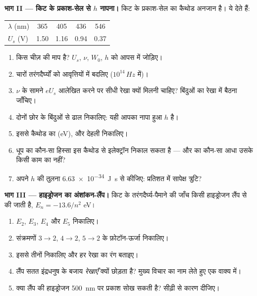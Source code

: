 \begin{problem}
\medskip
\noindent\textbf{भाग II --- किट के प्रकाश-सेल से $h$ नापना।}
किट के प्रकाश-सेल का कैथोड अनजान है।  ये देते हैं:
\begin{center}\small
\begin{tabular}{lcccc}
$\lambda$ (\unit{nm}) & 365 & 405 & 436 & 546\\
$U_s$ (\unit{V}) & 1.50 & 1.16 & 0.94 & 0.37
\end{tabular}
\end{center}
\begin{enumerate}[resume]
  \item {} किस चीज़ की माप है? $U_s$, $\nu$, $W_0$,
        $h$ को आपस में जोड़िए।
  \item चारों तरंगदैर्घ्यों को आवृत्तियों में बदलिए ($10^{14}\,\unit{Hz}$ में)।
  \item $\nu$ के सामने $eU_s$ आलेखित करने पर सीधी रेखा क्यों मिलनी चाहिए?
        बिंदुओं का रेखा में बैठना जाँचिए।
  \item दोनों छोर के बिंदुओं से ढाल निकालिए: यही आपका नापा हुआ $h$ है।
  \item इससे कैथोड का  (\unit{eV}), 
        और देहली  निकालिए।
  \item धूप का कौन-सा हिस्सा इस कैथोड से इलेक्ट्रॉन निकाल सकता है --- और
         का कौन-सा आधा उसके किसी काम का नहीं?
  \item अपने $h$ की तुलना \qty{6.63e-34}{J.s} से कीजिए: प्रतिशत में सापेक्ष त्रुटि?
\end{enumerate}

\medskip
\noindent\textbf{भाग III --- हाइड्रोजन का अंशांकन-लैंप।}
किट के तरंगदैर्घ्य-पैमाने की जाँच किसी हाइड्रोजन लैंप से की जाती है,
$E_n = -13.6/n^2$ \unit{eV}।
\begin{enumerate}[resume]
  \item $E_2$, $E_3$, $E_4$ और $E_5$ निकालिए।
  \item संक्रमणों $3 \to 2$, $4 \to 2$, $5 \to 2$ के फ़ोटॉन-ऊर्जा निकालिए।
  \item इससे तीनों  निकालिए और हर रेखा का रंग बताइए।
  \item लैंप सतत इंद्रधनुष के बजाय \emph{रेखाएँ} क्यों छोड़ता है? मुख्य विचार
        का नाम लेते हुए एक वाक्य में।
  \item क्या लैंप की हाइड्रोजन \qty{500}{nm} पर प्रकाश सोख सकती है? सीढ़ी से कारण
        दीजिए।
\end{enumerate}


\end{problem}
